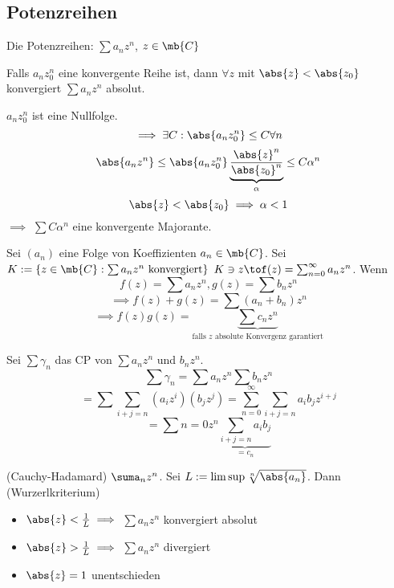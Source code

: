 \subsection{Potenzreihen}
\begin{Def}
  Die Potenzreihen: $\sum a_nz^n$, $z\in\mb{C}$
\end{Def}
\begin{Lem}
  Falls $a_nz_0^n$ eine konvergente Reihe ist, dann $\forall z$ mit $\abs{z}<\abs{z_0}$ konvergiert $\sum a_nz^n$ absolut.
\end{Lem}
\begin{Bew}
  $a_nz_0^n$ ist eine Nullfolge.
  \[\implies \exists C:\abs{a_nz_0^n}\leq C\forall n\]
  \[\abs{a_nz^n}\leq\abs{a_nz^n_0}\underbrace{\frac{\abs{z}^n}{\abs{z_0}^n}}_\alpha\leq C\alpha^n\]
  \[\abs{z}<\abs{z_0}\implies \alpha<1\]
  $\implies$ $\sum C\alpha^n$ eine konvergente Majorante.
\end{Bew}
\begin{Sat}
  Sei $(a_n)$ eine Folge von Koeffizienten $a_n\in\mb{C}$. Sei $K:=\left\{ z\in\mb{C}:\sum a_nz^n\text{ konvergiert} \right\}$ $K\ni z\tof(z)=\sum^\infty_{n=0}a_nz^n$. Wenn
  \[f(z)=\sum a_nz^n, g(z)=\sum b_nz^n\]
  \[\implies f(z)+g(z)=\sum(a_n+b_n)z^n\]
  \[\implies f(z)g(z)=\underbrace{\sum c_nz^n}_{\text{falls $z$ absolute Konvergenz garantiert}}\]
\end{Sat}
\begin{Bew}
  Sei $\sum \gamma_n$ das CP von $\sum a_nz^n$ und $b_nz^n$.
  \[\sum\gamma_n=\sum a_nz^n\sum b_nz^n\]
  \[=\sum\sum_{i+j=n}\left( a_iz^i \right)\left( b_jz^j \right)=\sum^\infty_{n=0}\sum_{i+j=n}a_ib_jz^{i+j}\]
  \[=\sum {n=0}z^n\underbrace{\sum_{i+j=n}a_ib_j}_{=c_n}\]
\end{Bew}
\begin{Sat}
  (Cauchy-Hadamard) $\suma_nz^n$. Sei $L:=\limsup \sqrt[n]{\abs{a_n}}$. Dann (Wurzerlkriterium)
  \begin{itemize}
    \item $\abs{z}<\frac{1}{L}\implies$ $\sum a_nz^n$ konvergiert absolut
    \item $\abs{z}>\frac{1}{L}\implies$ $\sum a_nz^n$ divergiert
    \item $\abs{z}=1$ unentschieden
  \end{itemize}
\end{Sat}
